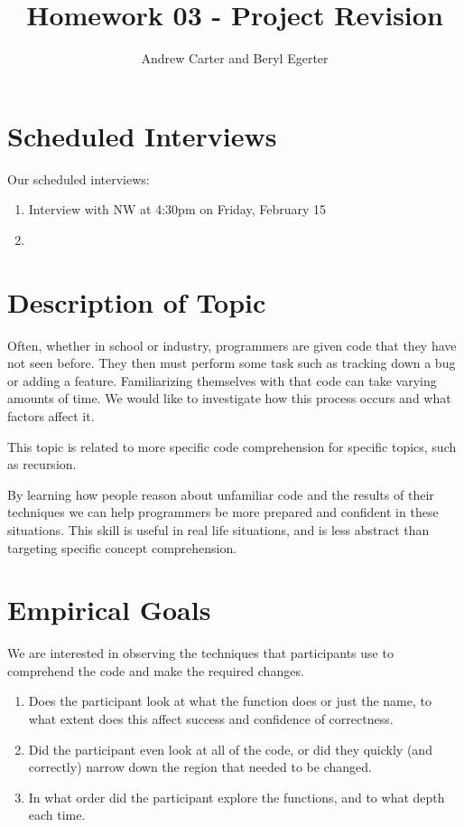 \documentclass{article}
\title{Homework 03 - Project Revision}
\author{Andrew Carter and Beryl Egerter}
\begin{document}
\maketitle
\section{Scheduled Interviews}
Our scheduled interviews:
\begin{enumerate}
  \item Interview with NW at 4:30pm on Friday, February 15
  \item
\end{enumerate}
\section{Description of Topic}

Often, whether in school or industry, programmers are given code that they have not seen before.
They then must perform some task such as tracking down a bug or adding a feature.
Familiarizing themselves with that code can take varying amounts of time.
We would like to investigate how this process occurs and what factors affect it.

This topic is related to more specific code comprehension for specific topics, such as recursion.

By learning how people reason about unfamiliar code and the results of their techniques we can help programmers be more prepared and confident in these situations.
This skill is useful in real life situations, and is less abstract than targeting specific concept comprehension.

\section{Empirical Goals}

We are interested in observing the techniques that participants use to comprehend the code and make the required changes.
\begin{enumerate}
	\item Does the participant look at what the function does or just the name, to what extent does this affect success and confidence of correctness.
	\item Did the participant even look at all of the code, or did they quickly (and correctly) narrow down the region that needed to be changed.
	\item In what order did the participant explore the functions, and to what depth each time.
\end{enumerate}
\end{document}
